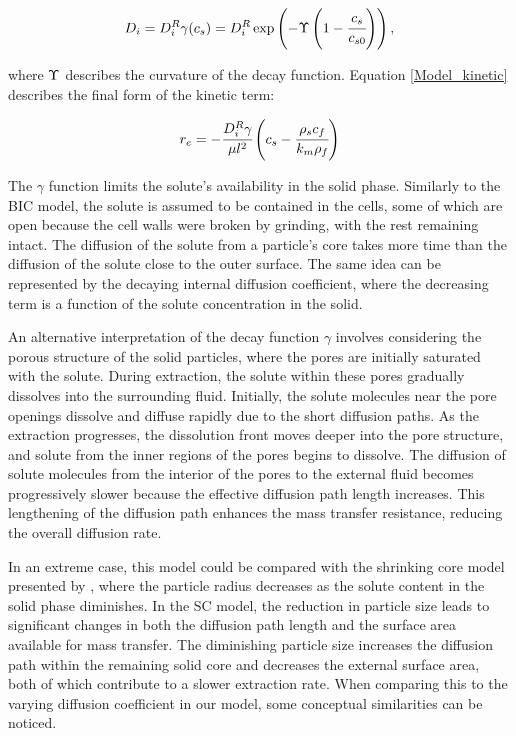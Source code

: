 \documentclass[a4paper,fleqn]{cas-dc}
\begin{document}
	{\footnotesize
		\begin{equation}
			D_i = D_i^R \gamma(c_s) = D_i^R \exp \left( - \Upsilon \left( 1-\cfrac{ c_s }{c_{s0}} \right) \right), \label{EQ: C_sat_function}
	\end{equation} }
	
	where  ${\color{black}\Upsilon}$ describes the curvature of the decay function. Equation \ref{Model_kinetic} describes the final form of the kinetic term:
	
	{\footnotesize
		\begin{equation}
			\label{Model_kinetic}
			r_e = -\cfrac{D_i^R \gamma }{ \mu l^2 } \left( c_s  - \cfrac{\rho_s c_f }{ k_m \rho_f }  \right)
	\end{equation} }
	
	The $\gamma$ function limits the solute's availability in the solid phase. Similarly to the BIC model, the solute is assumed to be contained in the cells, some of which are open because the cell walls were broken by grinding, with the rest remaining intact. The diffusion of the solute from a particle's core takes more time than the diffusion of the solute close to the outer surface. The same idea can be represented by the decaying internal diffusion coefficient, where the decreasing term is a function of the solute concentration in the solid. 
	
	An alternative interpretation of the decay function $\gamma$ involves considering the porous structure of the solid particles, where the pores are initially saturated with the solute. During extraction, the solute within these pores gradually dissolves into the surrounding fluid. Initially, the solute molecules near the pore openings dissolve and diffuse rapidly due to the short diffusion paths. As the extraction progresses, the dissolution front moves deeper into the pore structure, and solute from the inner regions of the pores begins to dissolve. The diffusion of solute molecules from the interior of the pores to the external fluid becomes progressively slower because the effective diffusion path length increases. This lengthening of the diffusion path enhances the mass transfer resistance, reducing the overall diffusion rate. 
	
	In an extreme case, this model could be compared with the shrinking core model presented by \citet{Goto1996}, where the particle radius decreases as the solute content in the solid phase diminishes. In the SC model, the reduction in particle size leads to significant changes in both the diffusion path length and the surface area available for mass transfer. The diminishing particle size increases the diffusion path within the remaining solid core and decreases the external surface area, both of which contribute to a slower extraction rate. When comparing this to the varying diffusion coefficient in our model, some conceptual similarities can be noticed.
	
\end{document}

